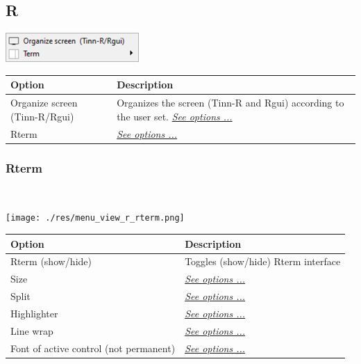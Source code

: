 \hypertarget{menu_view_r}{}
\subsection{R}

\includegraphics[scale=0.50]{./res/menu_view_r.png}\\

\begin{scriptsize}
  \begin{tabularx}{\textwidth}{>{\hsize=0.5\hsize}X>{\hsize=0.7\hsize}X}\\
    \hline
    \textbf{Option} & \textbf{Description} \\
    \hline
    Organize screen (Tinn-R/Rgui) & Organizes the screen (Tinn-R and Rgui) according to the user set. \textit{\href{\#working\_app\_r}{See options ...}} \\
    Rterm & \textit{\href{\#menu\_view\_r\_rterm}{See options ...}} \\
    \hline
  \end{tabularx}
\end{scriptsize}


\hypertarget{menu_view_r_rterm}{}
\subsubsection{Rterm}\\

\texttt{[image: ./res/menu\_view\_r\_rterm.png]}\\

\begin{scriptsize}
  \begin{tabularx}{\textwidth}{>{\hsize=0.7\hsize}X>{\hsize=0.7\hsize}X}\\
    \hline
    \textbf{Option} & \textbf{Description} \\
    \hline
    Rterm (show/hide) & Toggles (show/hide) Rterm interface \\
    Size & \textit{\href{\#menu\_view\_r\_rterm\_size}{See options ...}} \\
    Split & \textit{\href{\#menu\_view\_r\_rterm\_split}{See options ...}} \\
    Highlighter & \textit{\href{\#menu\_view\_r\_rterm\_highlighter}{See options ...}} \\
    Line wrap & \textit{\href{\#menu\_r\_rterm\_linewrap}{See options ...}} \\
    Font of active control (not permanent) & \textit{\href{\#menu\_r\_rterm\_fontsize}{See options ...}} \\
    \hline
  \end{tabularx}
\end{scriptsize}



